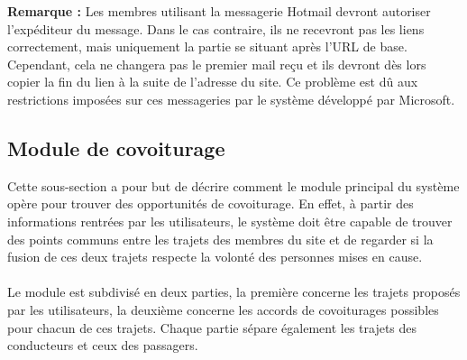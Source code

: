 \documentclass[12pt, a4paper, oneside]{article}
\begin{document}
     \textbf{Remarque :} Les membres utilisant la messagerie Hotmail devront autoriser l'expéditeur du message. Dans le cas contraire, ils ne recevront pas les liens correctement, mais uniquement la partie se situant après l'URL de base. Cependant, cela ne changera pas le premier mail reçu et ils devront dès lors copier la fin du lien à la suite de l'adresse du site. Ce problème est dû aux restrictions imposées sur ces messageries par le système développé par Microsoft.\\
     
\subsection{Module de covoiturage} \label{covoiturage}
    Cette sous-section a pour but de décrire comment le module principal du système opère pour trouver des opportunités de covoiturage. En effet, à partir des informations rentrées par les utilisateurs, le système doit être capable de trouver des points communs entre les trajets des membres du site et de regarder si la fusion de ces deux trajets respecte la volonté des personnes mises en cause.\\\\
    \indent Le module est subdivisé en deux parties, la première concerne les trajets proposés par les utilisateurs, la deuxième concerne les accords de covoiturages possibles pour chacun de ces trajets. Chaque partie sépare également les trajets des conducteurs et ceux des passagers.\\\\
\end{document}
